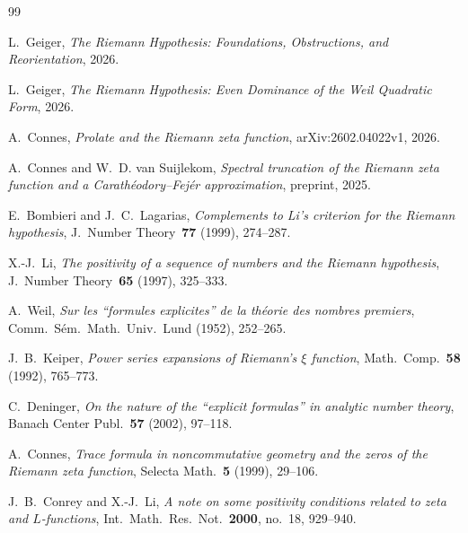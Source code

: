 \documentclass[12pt,a4paper]{article}
\theoremstyle{definition}
\theoremstyle{remark}
\begin{document}
\begin{thebibliography}{99}

L.~Geiger, \emph{The Riemann Hypothesis: Foundations, Obstructions, and Reorientation}, 2026.

L.~Geiger, \emph{The Riemann Hypothesis: Even Dominance of the Weil Quadratic Form}, 2026.

A.~Connes, \emph{Prolate and the Riemann zeta function}, arXiv:2602.04022v1, 2026.

A.~Connes and W.~D. van Suijlekom, \emph{Spectral truncation of the Riemann zeta function and a Carath\'eodory--Fej\'er approximation}, preprint, 2025.

E.~Bombieri and J.~C.~Lagarias, \emph{Complements to Li's criterion for the Riemann hypothesis}, J.~Number Theory~\textbf{77} (1999), 274--287.

X.-J.~Li, \emph{The positivity of a sequence of numbers and the Riemann hypothesis}, J.~Number Theory~\textbf{65} (1997), 325--333.

A.~Weil, \emph{Sur les ``formules explicites'' de la th\'eorie des nombres premiers}, Comm.~S\'em.~Math.~Univ.~Lund (1952), 252--265.

J.~B.~Keiper, \emph{Power series expansions of Riemann's $\xi$ function}, Math.~Comp.~\textbf{58} (1992), 765--773.

C.~Deninger, \emph{On the nature of the ``explicit formulas'' in analytic number theory}, Banach Center Publ.~\textbf{57} (2002), 97--118.

A.~Connes, \emph{Trace formula in noncommutative geometry and the zeros of the Riemann zeta function}, Selecta Math.~\textbf{5} (1999), 29--106.

J.~B.~Conrey and X.-J.~Li, \emph{A note on some positivity conditions related to zeta and $L$-functions}, Int.~Math.~Res.~Not.~\textbf{2000}, no.~18, 929--940.

\end{thebibliography}
\end{document}

